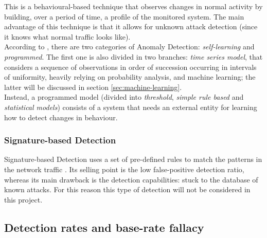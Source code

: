 This is a behavioural-based technique that observes changes in normal activity by building, over a period of time, a profile of the monitored system. The main advantage of this technique is that it allows for unknown attack detection (since it knows what normal traffic looks like). \\ According to \cite{Hodo2017}, there are two categories of Anomaly Detection: \textit{self-learning} and \textit{programmed}. The first one is also divided in two branches: \textit{time series model}, that considers a sequence of observations in order of succession occurring in intervals of uniformity, heavily relying on probability analysis, and machine learning; the latter  will be discussed in section \ref{sec:machine-learning}. \\ Instead, a programmed model (divided into \textit{threshold}, \textit{simple rule based} and \textit{statistical models}) consists of a system that needs an external entity for learning how to detect changes in behaviour.

\subsubsection{Signature-based Detection}
\label{subsubsec:signature-detection}

Signature-based Detection uses a set of pre-defined rules to match the patterns in the network traffic \cite{Hodo2017}. Its selling point is the low false-positive detection ratio, whereas its main drawback is the detection capabilities: stuck to the database of known attacks. For this reason this type of detection will not be considered in this project.


\subsection{Detection rates and base-rate fallacy}
\label{subsec:detection-rates}

